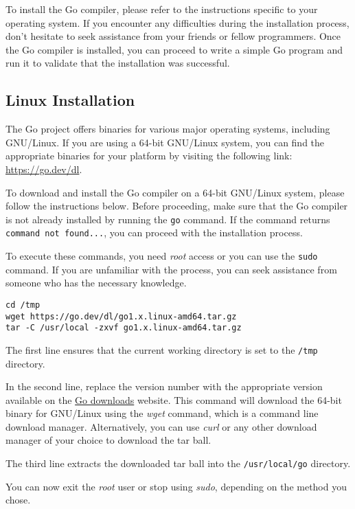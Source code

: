 To install the Go compiler, please refer to the instructions specific to your
operating system. If you encounter any difficulties during the installation
process, don't hesitate to seek assistance from your friends or fellow
programmers. Once the Go compiler is installed, you can proceed to write a
simple Go program and run it to validate that the installation was successful.

\subsection{Linux Installation}

The Go project offers binaries for various major operating systems, including
GNU/Linux. If you are using a 64-bit GNU/Linux system, you can find the
appropriate binaries for your platform by visiting the following link:
\url{https://go.dev/dl}.

To download and install the Go compiler on a 64-bit
GNU/Linux system, please follow the instructions below. Before proceeding, make
sure that the Go compiler is not already installed by running the \texttt{go}
command. If the command returns \texttt{command not found...}, you can proceed
with the installation process.

To execute these commands, you need \textit{root} access or you can use
the \texttt{sudo} command. If you are unfamiliar with the process, you can seek
assistance from someone who has the necessary knowledge.

\begin{lstlisting}[numbers=none]
cd /tmp
wget https://go.dev/dl/go1.x.linux-amd64.tar.gz
tar -C /usr/local -zxvf go1.x.linux-amd64.tar.gz
\end{lstlisting}

The first line ensures that the current working directory is set to
the \texttt{/tmp} directory.

In the second line, replace the version number with the appropriate version
available on the \href{https://go.dev/dl}{Go downloads} website. This command
will download the 64-bit binary for GNU/Linux using the \textit{wget} command,
which is a command line download manager. Alternatively, you can
use \textit{curl} or any other download manager of your choice to download the
tar ball.

The third line extracts the downloaded tar ball into the \texttt{/usr/local/go}
directory.

You can now exit the \textit{root} user or stop using \textit{sudo}, depending
on the method you chose.

